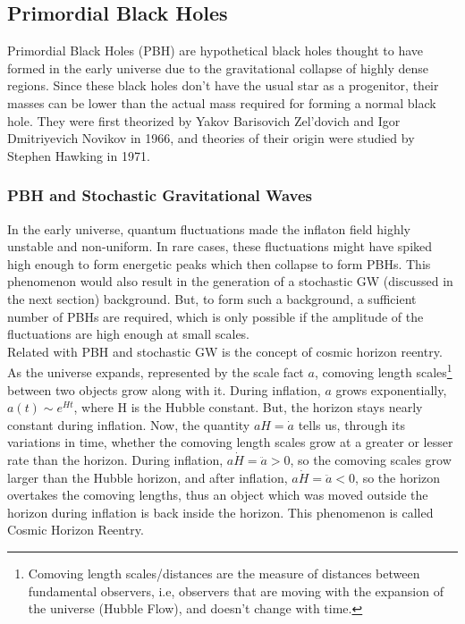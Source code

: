 \subsection{Primordial Black Holes}
Primordial Black Holes (PBH) are hypothetical black holes thought to have formed in the early universe due to the gravitational collapse of highly dense regions. Since these black holes don't have the usual star as a progenitor, their masses can be lower than the actual mass required for forming a normal black hole. They were first theorized by Yakov Barisovich Zel'dovich and Igor Dmitriyevich Novikov in 1966, and theories of their origin were studied by Stephen Hawking in 1971. \cite{PBH_defn}

\subsubsection{PBH and Stochastic Gravitational Waves}
In the early universe, quantum fluctuations made the inflaton field highly unstable and non-uniform. In rare cases, these fluctuations might have spiked high enough to form energetic peaks which then collapse to form PBHs. This phenomenon would also result in the generation of a stochastic GW (discussed in the next section) background. But, to form such a background, a sufficient number of PBHs are required, which is only possible if the amplitude of the fluctuations are high enough at small scales. \cite{Nakama_2017}\\

Related with PBH and stochastic GW is the concept of cosmic horizon reentry. As the universe expands, represented by the scale fact $a$, comoving length scales\footnote{Comoving length scales/distances are the measure of distances between fundamental observers, i.e, observers that are moving with the expansion of the universe (Hubble Flow), and doesn't change with time.}  between two objects grow along with it. During inflation, $a$ grows exponentially, $a(t) \sim e^{Ht}$, where H is the Hubble constant. But, the horizon stays nearly constant during inflation. Now, the quantity $aH = \dot{a}$ tells us, through its variations in time, whether the comoving length scales grow at a greater or lesser rate than the horizon. During inflation, $a\dot{H} = \ddot{a} > 0$, so the comoving scales grow larger than the Hubble horizon, and after inflation, $a\dot{H} = \ddot{a} < 0$, so the horizon overtakes the comoving lengths, thus an object which was moved outside the horizon during inflation is back inside the horizon. This phenomenon is called Cosmic Horizon Reentry.\\

